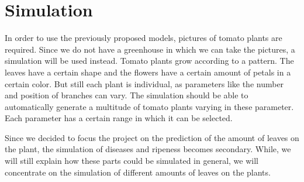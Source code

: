 \section{Simulation}

In order to use the previously proposed models, pictures of tomato plants are required. Since we do not have a greenhouse in which we can take the pictures, a simulation will be used instead. Tomato plants grow according to a pattern. The leaves have a certain shape and the flowers have a certain amount of petals in a certain color. But still each plant is individual, as parameters like the number and position of branches can vary. The simulation should be able to automatically generate a multitude of tomato plants varying in these parameter. Each parameter has a certain range in which it can be selected.

Since we decided to focus the project on the prediction of the amount of leaves on the plant, the simulation of diseases and ripeness becomes secondary. While, we will still explain how these parts could be simulated in general, we will concentrate on the simulation of different amounts of leaves on the plants.  